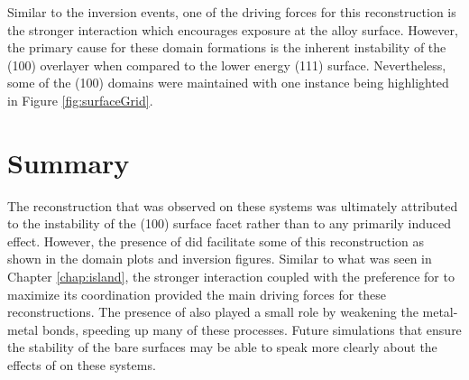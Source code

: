 Similar to the inversion events, one of the driving forces for this
reconstruction is the stronger  interaction which encourages
 exposure at the alloy surface. However, the primary cause for these
domain formations is the inherent instability of the (100) overlayer when
compared to the lower energy (111) surface. Nevertheless, some of the (100)
domains were maintained with one instance being highlighted in Figure
\ref{fig:surfaceGrid}.


\section{Summary}
The reconstruction that was observed on these systems was ultimately attributed
to the instability of the (100) surface facet rather than to any primarily
 induced effect. However, the presence of  did facilitate some of
this reconstruction as shown in the domain plots and inversion figures. Similar
to what was seen in Chapter \ref{chap:island}, the stronger 
interaction coupled with the preference for  to maximize its coordination
provided the main driving forces for these reconstructions. The
presence of  also played a small role by weakening the metal-metal
bonds, speeding up many of these processes. Future simulations that ensure the
stability of the bare surfaces may be able to speak more clearly about the
effects of  on these systems.

